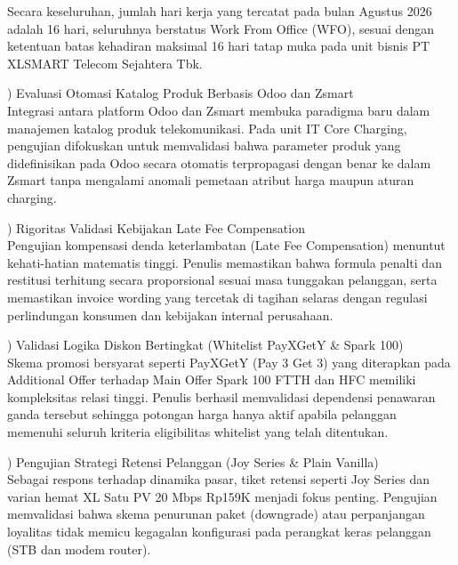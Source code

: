 \documentclass[12pt,a4paper]{article}
\begin{document}
\vspace{0.2cm}
\noindent Secara keseluruhan, jumlah hari kerja yang tercatat pada bulan Agustus 2026 adalah 16 hari, seluruhnya berstatus Work From Office (WFO), sesuai dengan ketentuan batas kehadiran maksimal 16 hari tatap muka pada unit bisnis PT XLSMART Telecom Sejahtera Tbk.

\clearpage
{}
) Evaluasi Otomasi Katalog Produk Berbasis Odoo dan Zsmart\\
Integrasi antara platform Odoo dan Zsmart membuka paradigma baru dalam manajemen katalog produk telekomunikasi. Pada unit IT Core Charging, pengujian difokuskan untuk memvalidasi bahwa parameter produk yang didefinisikan pada Odoo secara otomatis terpropagasi dengan benar ke dalam Zsmart tanpa mengalami anomali pemetaan atribut harga maupun aturan charging.

\vspace{0.2cm}
) Rigoritas Validasi Kebijakan Late Fee Compensation\\
Pengujian kompensasi denda keterlambatan (Late Fee Compensation) menuntut kehati-hatian matematis tinggi. Penulis memastikan bahwa formula penalti dan restitusi terhitung secara proporsional sesuai masa tunggakan pelanggan, serta memastikan invoice wording yang tercetak di tagihan selaras dengan regulasi perlindungan konsumen dan kebijakan internal perusahaan.

\vspace{0.2cm}
) Validasi Logika Diskon Bertingkat (Whitelist PayXGetY \& Spark 100)\\
Skema promosi bersyarat seperti PayXGetY (Pay 3 Get 3) yang diterapkan pada Additional Offer terhadap Main Offer Spark 100 FTTH dan HFC memiliki kompleksitas relasi tinggi. Penulis berhasil memvalidasi dependensi penawaran ganda tersebut sehingga potongan harga hanya aktif apabila pelanggan memenuhi seluruh kriteria eligibilitas whitelist yang telah ditentukan.

\vspace{0.2cm}
) Pengujian Strategi Retensi Pelanggan (Joy Series \& Plain Vanilla)\\
Sebagai respons terhadap dinamika pasar, tiket retensi seperti Joy Series dan varian hemat XL Satu PV 20 Mbps Rp159K menjadi fokus penting. Pengujian memvalidasi bahwa skema penurunan paket (downgrade) atau perpanjangan loyalitas tidak memicu kegagalan konfigurasi pada perangkat keras pelanggan (STB dan modem router).
\end{document}
